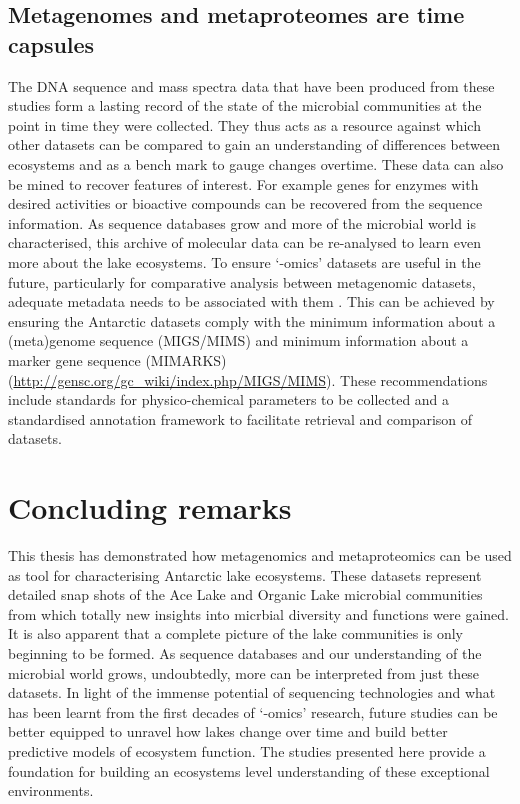 \subsection{Metagenomes and metaproteomes are time capsules}
The \textsc{DNA} sequence and mass spectra data that have been produced from these studies form a lasting record of the state of the microbial communities at the point in time they were collected.
They thus acts as a resource against which other datasets can be compared to gain an understanding of differences between ecosystems and as a bench mark to gauge changes overtime.
These data can also be mined to recover features of interest.
For example genes for enzymes with desired activities or bioactive compounds can be recovered from the sequence information.
As sequence databases grow and more of the microbial world is characterised, this archive of molecular data can be re-analysed to learn even more about the lake ecosystems.
To ensure `-omics' datasets are useful in the future, particularly for comparative analysis between metagenomic datasets, adequate metadata needs to be associated with them \cite{Raes2007}.
This can be achieved by ensuring the Antarctic datasets comply with the minimum information about a (meta)genome sequence (MIGS/MIMS) \cite{Field2007} and minimum information about a marker gene sequence (MIMARKS) \cite{Yilmaz2011}  
(\url{http://gensc.org/gc_wiki/index.php/MIGS/MIMS}).
These recommendations include standards for physico-chemical parameters to be collected and a standardised annotation framework to facilitate retrieval and comparison of datasets.

%

\section{Concluding remarks}
This thesis has demonstrated how metagenomics and metaproteomics can be used as tool for characterising Antarctic lake ecosystems.
These datasets represent detailed snap shots of the Ace Lake and Organic Lake microbial communities from which totally new insights into micrbial diversity and functions were gained.
It is also apparent that a complete picture of the lake communities is only beginning to be formed.
As sequence databases and our understanding of the microbial world grows, undoubtedly, more can be interpreted from just these datasets.
In light of the immense potential of sequencing technologies and what has been learnt from the first decades of `-omics' research, future studies can be better equipped to unravel how lakes change over time and build better predictive models of ecosystem function.  
The studies presented here provide a foundation for building an ecosystems level understanding of these exceptional environments.
